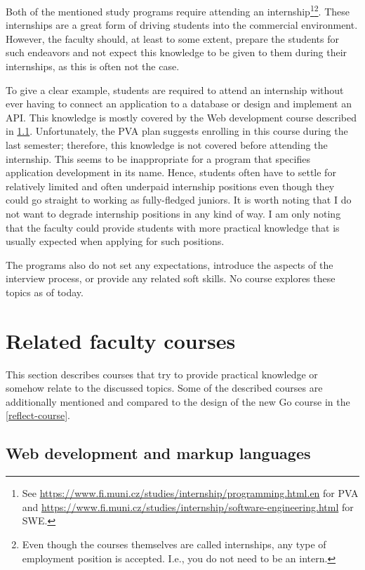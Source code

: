 \documentclass[
  digital,
  color,
  oneside,
  nosansbold,
  nocolorbold,
  lof,
  nolot,
]{fithesis4}
\begin{document}
Both of the mentioned study programs require attending an internship\footnote{See \url{https://www.fi.muni.cz/studies/internship/programming.html.en} for PVA and \url{https://www.fi.muni.cz/studies/internship/software-engineering.html} for SWE.}\footnote{Even though the courses themselves are called internships, any type of employment position is accepted. I.e., you do not need to be an intern.}. These internships are a great form of driving students into the commercial environment. However, the faculty should, at least to some extent, prepare the students for such endeavors and not expect this knowledge to be given to them during their internships, as this is often not the case. 

To give a clear example, students are required to attend an internship without ever having to connect an application to a database or design and implement an API. This knowledge is mostly covered by the Web development course described in \cref{web-dev}. Unfortunately, the PVA plan suggests enrolling in this course during the last semester; therefore, this knowledge is not covered before attending the internship. This seems to be inappropriate for a program that specifies application development in its name. Hence, students often have to settle for relatively limited and often underpaid internship positions even though they could go straight to working as fully-fledged juniors. It is worth noting that I do not want to degrade internship positions in any kind of way. I am only noting that the faculty could provide students with more practical knowledge that is usually expected when applying for such positions.

The programs also do not set any expectations, introduce the aspects of the interview process, or provide any related soft skills. No course explores these topics as of today.

\section{Related faculty courses}

This section describes courses that try to provide practical knowledge or somehow relate to the discussed topics. Some of the described courses are additionally mentioned and compared to the design of the new Go course in the \cref{reflect-course}.

\subsection{Web development and markup languages}\label{web-dev}
\end{document}
